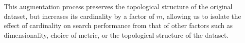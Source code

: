 This augmentation process preserves the topological structure of the original dataset, but increases its cardinality by a factor of $m$, allowing us to isolate the effect of cardinality on search performance from that of other factors such as dimensionality, choice of metric, or the topological structure of the dataset.
